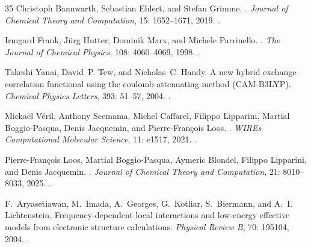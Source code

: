 \documentclass[11pt,a4paper]{article}
\begin{document}
\begin{thebibliography}{35}
Christoph Bannwarth, Sebastian Ehlert, and Stefan Grimme.
.
\newblock \emph{Journal of Chemical Theory and Computation}, 15:
  1652--1671, 2019.
\newblock {}.

Irmgard Frank, J{\"u}rg Hutter, Dominik Marx, and Michele Parrinello.
.
\newblock \emph{The Journal of Chemical Physics}, 108: 4060--4069,
  1998.
\newblock {}.

Takeshi Yanai, David~P. Tew, and Nicholas~C. Handy.
\newblock A new hybrid exchange--correlation functional using the
  coulomb-attenuating method ({CAM-B3LYP}).
\newblock \emph{Chemical Physics Letters}, 393: 51--57, 2004.
\newblock {}.

Micka{\"e}l V{\'e}ril, Anthony Scemama, Michel Caffarel, Filippo Lipparini,
  Martial Boggio‐Pasqua, Denis Jacquemin, and Pierre‐Fran{\c c}ois Loos.
.
\newblock \emph{WIREs Computational Molecular Science}, 11: e1517,
  2021.
\newblock {}.

Pierre-Fran{\c c}ois Loos, Martial Boggio-Pasqua, Aymeric Blondel, Filippo
  Lipparini, and Denis Jacquemin.
.
\newblock \emph{Journal of Chemical Theory and Computation}, 21:
  8010--8033, 2025.
\newblock {}.

F.~Aryasetiawan, M.~Imada, A.~Georges, G.~Kotliar, S.~Biermann, and A.~I.
  Lichtenstein.
\newblock Frequency-dependent local interactions and low-energy effective
  models from electronic structure calculations.
\newblock \emph{Physical Review B}, 70: 195104, 2004.
\newblock {}.


\end{thebibliography}
\end{document}
